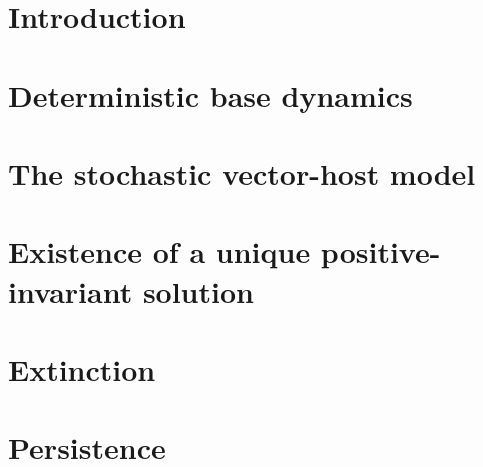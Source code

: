 \documentclass[3p,sort&compress,times]{elsarticle}
\theoremstyle{plain}
\theoremstyle{definition}
\begin{document}
    
    \section{Introduction}
    \section{Deterministic base dynamics}
        
    \section{The stochastic vector-host model}
        
    \section{Existence of a unique positive-invariant solution}
    \section{Extinction}
        
    \section{Persistence}
        
%
    
    
\end{document}
